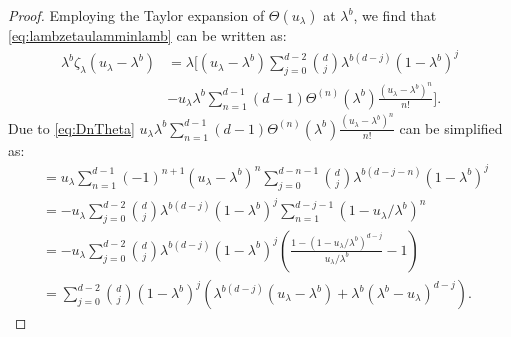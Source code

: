 \documentclass[12pt]{report}
\begin{document}
\begin{proof}
Employing the Taylor expansion of $\Theta(u_\lambda)$ at $\lambda^b$, we find that \eqref{eq:lambzetaulamminlamb} can be written as:
\begin{align}
\lambda^b \zeta_\lambda(u_\lambda-\lambda^b)
&=
\lambda \bigg[ (u_\lambda - \lambda^b) \sum_{j=0}^{d-2} \binom{d}{j} \lambda^{b(d-j)} (1-\lambda^b)^j\\
&- u_\lambda \lambda^b \sum_{n=1}^{d-1} (d-1) \Theta^{(n)}(\lambda^b) \frac{(u_\lambda-\lambda^b)^n}{n!}\bigg].\label{eq:taylor_exp}
\end{align}
Due to \eqref{eq:DnTheta} $u_\lambda \lambda^b \sum_{n=1}^{d-1} (d-1) \Theta^{(n)}(\lambda^b) \frac{(u_\lambda-\lambda^b)^n}{n!}$  can be simplified as:
\begin{align*}
&= u_\lambda \sum_{n=1}^{d-1} (-1)^{n+1} (u_\lambda-\lambda^b)^n \sum_{j=0}^{d-n-1} \binom{d}{j} \lambda^{b(d-j-n)} (1-\lambda^b)^j\\
&=-u_\lambda \sum_{j=0}^{d-2} \binom{d}{j} \lambda^{b(d-j)} (1-\lambda^b)^j \sum_{n=1}^{d-j-1} 
 (1-u_\lambda/\lambda^b)^n\\
 &=-u_\lambda \sum_{j=0}^{d-2} \binom{d}{j} \lambda^{b(d-j)} (1-\lambda^b)^j \left(
\frac{1-(1-u_\lambda/\lambda^b)^{d-j}}{u_\lambda/\lambda^b}-1 \right)\\
 &= \sum_{j=0}^{d-2} \binom{d}{j} (1-\lambda^b)^j \left(
\lambda^{b(d-j)}  (u_\lambda - \lambda^b)+\lambda^b (\lambda^b-u_\lambda)^{d-j}\right).   
\end{align*}


\end{proof}
\end{document}
